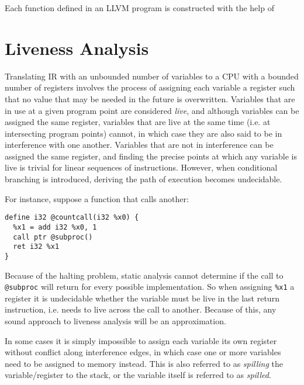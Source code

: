 \documentclass{article}
\begin{document}

Each function defined in an LLVM program is constructed with the help of

\section{Liveness Analysis}

%

Translating IR with an unbounded number of variables to a CPU with a bounded number of registers involves the process of assigning each variable a register such that no value that may be needed in the future is overwritten. %
Variables that are in use at a given program point are considered \textit{live}, and although variables can be assigned the same register, %
variables that are live at the same time (i.e. at intersecting program points) cannot, in which case they are also said to be in interference with one another.
 Variables that are not in interference can be assigned the same register, and finding the precise points at which any variable is live is trivial for linear sequences of instructions. However, when conditional branching is introduced, deriving the path of execution becomes undecidable. %

For instance, suppose a function that calls another:

\begin{verbatim}
define i32 @countcall(i32 %x0) {
  %x1 = add i32 %x0, 1
  call ptr @subproc()
  ret i32 %x1
}
\end{verbatim}
Because of the halting problem, static analysis cannot determine if the call to \lstinline!@subproc! will return for every possible implementation.  %
So when assigning \lstinline!%x1! a register it is undecidable whether the variable must be live in the last return instruction, i.e. needs to live across the call to another. Because of this, any sound approach to liveness analysis will be an approximation.

In some cases it is simply impossible to assign each variable its own register without conflict along interference edges, in which case one or more variables need to be assigned to memory instead. This is also referred to as \textit{spilling} the variable/register to the stack, or the variable itself is referred to as \textit{spilled}.
\end{document}
